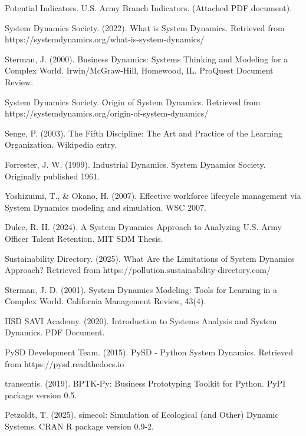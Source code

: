 \documentclass[main.tex]{subfiles}
\begin{document}
\begin{thebibliography}{21}

Potential Indicators. U.S. Army Branch Indicators. (Attached PDF document).

System Dynamics Society. (2022). What is System Dynamics. Retrieved from https://systemdynamics.org/what-is-system-dynamics/

Sterman, J. (2000). Business Dynamics: Systems Thinking and Modeling for a Complex World. Irwin/McGraw-Hill, Homewood, IL. ProQuest Document Review.

System Dynamics Society. Origin of System Dynamics. Retrieved from https://systemdynamics.org/origin-of-system-dynamics/

Senge, P. (2003). The Fifth Discipline: The Art and Practice of the Learning Organization. Wikipedia entry.

Forrester, J. W. (1999). Industrial Dynamics. System Dynamics Society. Originally published 1961.

Yoshizuimi, T., \& Okano, H. (2007). Effective workforce lifecycle management via System Dynamics modeling and simulation. WSC 2007.

Dulce, R. II. (2024). A System Dynamics Approach to Analyzing U.S. Army Officer Talent Retention. MIT SDM Thesis.

Sustainability Directory. (2025). What Are the Limitations of System Dynamics Approach? Retrieved from https://pollution.sustainability-directory.com/

Sterman, J. D. (2001). System Dynamics Modeling: Tools for Learning in a Complex World. California Management Review, 43(4).

IISD SAVI Academy. (2020). Introduction to Systems Analysis and System Dynamics. PDF Document.

PySD Development Team. (2015). PySD - Python System Dynamics. Retrieved from https://pysd.readthedocs.io

transentis. (2019). BPTK-Py: Business Prototyping Toolkit for Python. PyPI package version 0.5.

Petzoldt, T. (2025). simecol: Simulation of Ecological (and Other) Dynamic Systems. CRAN R package version 0.9-2.


\end{thebibliography}
\end{document}
